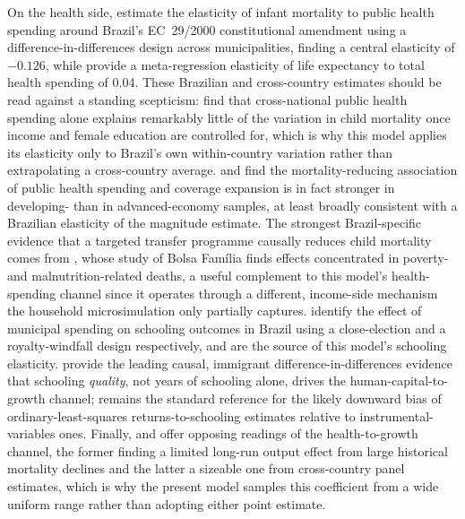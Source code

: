 \documentclass[11pt,a4paper]{article}
\begin{document}
On the health side, \citet{szkloclarkerocha2024} estimate the elasticity of infant mortality to public health spending around Brazil's EC~29/2000 constitutional amendment using a difference-in-differences design across municipalities, finding a central elasticity of $-0.126$, while \citet{gallet2017} provide a meta-regression elasticity of life expectancy to total health spending of 0.04. These Brazilian and cross-country estimates should be read against a standing scepticism: \citet{filmerpritchett1999} find that cross-national public health spending alone explains remarkably little of the variation in child mortality once income and female education are controlled for, which is why this model applies its elasticity only to Brazil's own within-country variation rather than extrapolating a cross-country average. \citet{bokharigaigottret2007} and \citet{morenoserrasmith2012,morenoserrasmith2015} find the mortality-reducing association of public health spending and coverage expansion is in fact stronger in developing- than in advanced-economy samples, at least broadly consistent with a Brazilian elasticity of the magnitude \citet{szkloclarkerocha2024} estimate. The strongest Brazil-specific evidence that a targeted transfer programme causally reduces child mortality comes from \citet{rasellaetal2013}, whose study of Bolsa Fam\'ilia finds effects concentrated in poverty- and malnutrition-related deaths, a useful complement to this model's health-spending channel since it operates through a different, income-side mechanism the household microsimulation only partially captures. \citet{litschig2013,litschig2012} identify the effect of municipal spending on schooling outcomes in Brazil using a close-election and a royalty-windfall design respectively, and are the source of this model's schooling elasticity. \citet{hanushekwoessmann2012} provide the leading causal, immigrant difference-in-differences evidence that schooling \emph{quality}, not years of schooling alone, drives the human-capital-to-growth channel; \citet{card1999} remains the standard reference for the likely downward bias of ordinary-least-squares returns-to-schooling estimates relative to instrumental-variables ones. Finally, \citet{acemoglujohnson2007} and \citet{bloomcanningsevilla2001} offer opposing readings of the health-to-growth channel, the former finding a limited long-run output effect from large historical mortality declines and the latter a sizeable one from cross-country panel estimates, which is why the present model samples this coefficient from a wide uniform range rather than adopting either point estimate.
\end{document}
